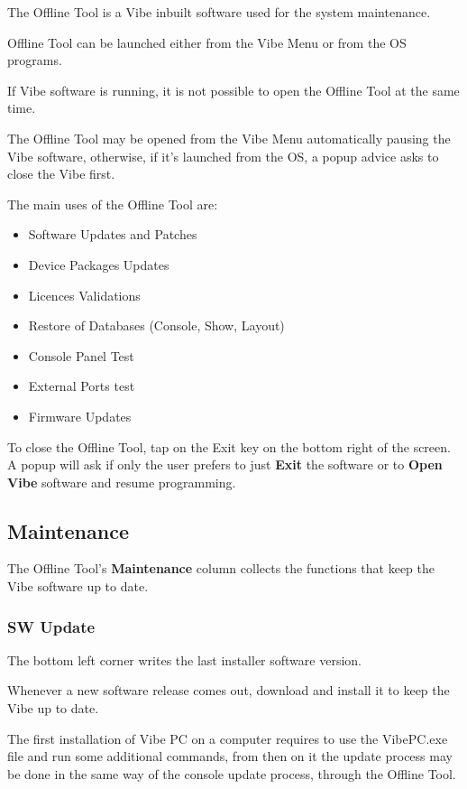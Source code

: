 \documentclass[
]{article}
\begin{document}
The Offline Tool is a Vibe inbuilt software used for the system maintenance.

Offline Tool can be launched either from the Vibe Menu or from the OS programs.

If Vibe software is running, it is not possible to open the Offline Tool at the same time.

The Offline Tool may be opened from the Vibe Menu automatically pausing the Vibe software, otherwise, if it's launched from the OS, a popup advice asks to close the Vibe first.

The main uses of the Offline Tool are:

\begin{itemize}
\item
  Software Updates and Patches
\item
  Device Packages Updates
\item
  Licences Validations
\item
  Restore of Databases (Console, Show, Layout)
\item
  Console Panel Test
\item
  External Ports test
\item
  Firmware Updates
\end{itemize}

To close the Offline Tool, tap on the Exit key on the bottom right of the screen. A popup will ask if only the user prefers to just \textbf{Exit} the software or to \textbf{Open Vibe} software and resume programming.

\hypertarget{maintenance}{%
\subsection{Maintenance}\label{maintenance}}

The Offline Tool's \textbf{Maintenance} column collects the functions that keep the Vibe software up to date.

\hypertarget{sw-update}{%
\subsubsection{SW Update}\label{sw-update}}

The bottom left corner writes the last installer software version.

Whenever a new software release comes out, download and install it to keep the Vibe up to date.

The first installation of Vibe PC on a computer requires to use the VibePC.exe file and run some additional commands, from then on it the update process may be done in the same way of the console update process, through the Offline Tool.
\end{document}
